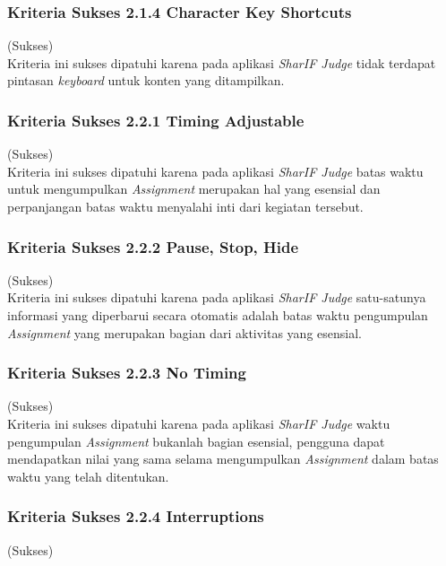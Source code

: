 \documentclass[a4paper,twoside]{article}
\begin{document}
\begin{enumerate}
\begin{itemize}
		\end{itemize}
		
		\subsubsection*{Kriteria Sukses 2.1.4 Character Key Shortcuts}
		\label{subsubsec:kepatuhan_kriteria_2.1.4}
		(Sukses) \\
		
		Kriteria ini sukses dipatuhi karena pada aplikasi \textit{SharIF Judge} tidak terdapat pintasan \textit{keyboard} untuk konten yang ditampilkan.
		
		\subsubsection*{Kriteria Sukses 2.2.1 Timing Adjustable}
		\label{subsubsec:kepatuhan_kriteria_2.2.1}
		(Sukses) \\
		
		Kriteria ini sukses dipatuhi karena pada aplikasi \textit{SharIF Judge} batas waktu untuk mengumpulkan \textit{Assignment} merupakan hal yang esensial dan perpanjangan batas waktu menyalahi inti dari kegiatan tersebut.
		
		\subsubsection*{Kriteria Sukses 2.2.2 Pause, Stop, Hide}
		\label{subsubsec:kepatuhan_kriteria_2.2.2}
		(Sukses) \\
		
		Kriteria ini sukses dipatuhi karena pada aplikasi \textit{SharIF Judge} satu-satunya informasi yang diperbarui secara otomatis adalah batas waktu pengumpulan \textit{Assignment} yang merupakan bagian dari aktivitas yang esensial.
		
		\subsubsection*{Kriteria Sukses 2.2.3 No Timing}
		\label{subsubsec:kepatuhan_kriteria_2.2.3}
		(Sukses) \\
		
		Kriteria ini sukses dipatuhi karena pada aplikasi \textit{SharIF Judge} waktu pengumpulan \textit{Assignment} bukanlah bagian esensial, pengguna dapat mendapatkan nilai yang sama selama mengumpulkan \textit{Assignment} dalam batas waktu yang telah ditentukan.
		
		\subsubsection*{Kriteria Sukses 2.2.4 Interruptions}
		\label{subsubsec:kepatuhan_kriteria_2.2.4}
		(Sukses) \\
		

\end{enumerate}
\end{document}
